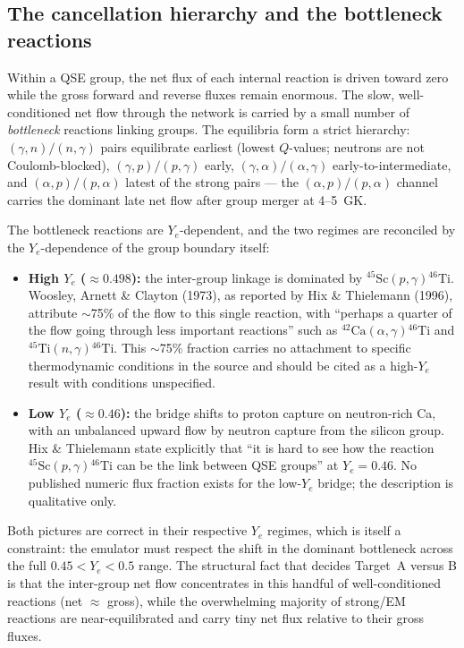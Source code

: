 \documentclass[11pt]{article}
\newcommand{\nuc}[2]{\ensuremath{{}^{#2}\mathrm{#1}}}
\begin{document}
\subsection{The cancellation hierarchy and the bottleneck reactions}

Within a QSE group, the net flux of each internal reaction is driven toward zero while the gross forward and reverse fluxes remain enormous. The slow, well-conditioned net flow through the network is carried by a small number of \emph{bottleneck} reactions linking groups. The equilibria form a strict hierarchy: $(\gamma,n)/(n,\gamma)$ pairs equilibrate earliest (lowest $Q$-values; neutrons are not Coulomb-blocked), $(\gamma,p)/(p,\gamma)$ early, $(\gamma,\alpha)/(\alpha,\gamma)$ early-to-intermediate, and $(\alpha,p)/(p,\alpha)$ latest of the strong pairs --- the $(\alpha,p)/(p,\alpha)$ channel carries the dominant late net flow after group merger at 4--5~GK.

The bottleneck reactions are $Y_e$-dependent, and the two regimes are reconciled by the $Y_e$-dependence of the group boundary itself:
\begin{itemize}
\item \textbf{High $Y_e$ ($\approx 0.498$):} the inter-group linkage is dominated by $\nuc{Sc}{45}(p,\gamma)\nuc{Ti}{46}$. Woosley, Arnett \& Clayton (1973), as reported by Hix \& Thielemann (1996), attribute $\sim$75\% of the flow to this single reaction, with ``perhaps a quarter of the flow going through less important reactions'' such as $\nuc{Ca}{42}(\alpha,\gamma)\nuc{Ti}{46}$ and $\nuc{Ti}{45}(n,\gamma)\nuc{Ti}{46}$. This $\sim$75\% fraction carries no attachment to specific thermodynamic conditions in the source and should be cited as a high-$Y_e$ result with conditions unspecified.
\item \textbf{Low $Y_e$ ($\approx 0.46$):} the bridge shifts to proton capture on neutron-rich Ca, with an unbalanced upward flow by neutron capture from the silicon group. Hix \& Thielemann state explicitly that ``it is hard to see how the reaction $\nuc{Sc}{45}(p,\gamma)\nuc{Ti}{46}$ can be the link between QSE groups'' at $Y_e = 0.46$. No published numeric flux fraction exists for the low-$Y_e$ bridge; the description is qualitative only.
\end{itemize}

Both pictures are correct in their respective $Y_e$ regimes, which is itself a constraint: the emulator must respect the shift in the dominant bottleneck across the full $0.45 < Y_e < 0.5$ range. The structural fact that decides Target~A versus B is that the inter-group net flow concentrates in this handful of well-conditioned reactions (net $\approx$ gross), while the overwhelming majority of strong/EM reactions are near-equilibrated and carry tiny net flux relative to their gross fluxes.
\end{document}
